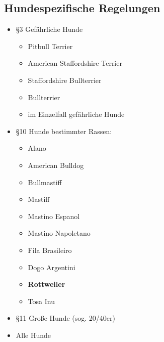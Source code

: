     \subsection{Hundespezifische Regelungen}
    \begin{itemize}
        \item §3 Gefährliche Hunde
        \begin{itemize}
            \item Pitbull Terrier
            \item American Staffordshire Terrier
            \item Staffordshire Bullterrier
            \item Bullterrier
            \item im Einzelfall gefährliche Hunde
        \end{itemize}
        \item §10 Hunde bestimmter Rassen:
        \begin{itemize}
            \item Alano
            \item American Bulldog
            \item Bullmastiff
            \item Mastiff
            \item Mastino Espanol
            \item Mastino Napoletano
            \item Fila Brasileiro
            \item Dogo Argentini
            \item \textbf{Rottweiler}
            \item Tosa Inu
        \end{itemize}
        \item §11 Große Hunde (sog. 20/40er)
        \item Alle Hunde
    \end{itemize}